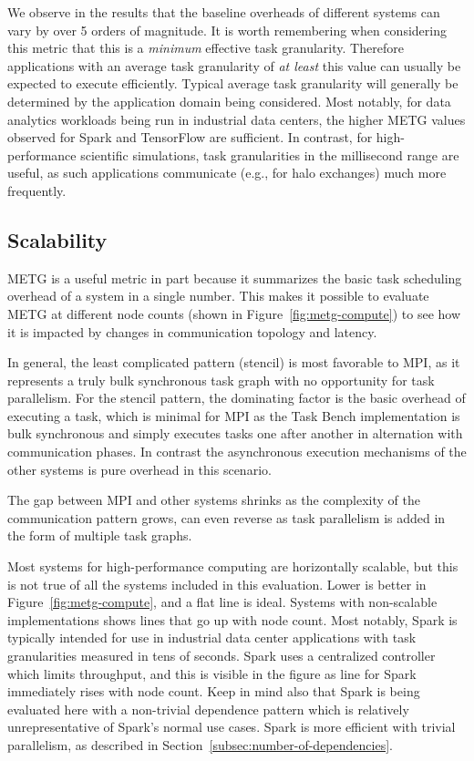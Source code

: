 We observe in the results that the baseline overheads of different
systems can vary by over 5 orders of magnitude. It is worth
remembering when considering this metric that this is a \emph{minimum}
effective task granularity. Therefore applications with an average
task granularity of \emph{at least} this value can usually be expected
to execute efficiently. Typical average task granularity will
generally be determined by the application domain being
considered. Most notably, for data analytics workloads being run in
industrial data centers, the higher METG values observed for Spark and
TensorFlow are sufficient. In contrast, for high-performance
scientific simulations, task granularities in the millisecond range
are useful, as such applications communicate (e.g., for halo
exchanges) much more frequently.

\subsection{Scalability}
\label{subsec:scalability}

METG is a useful metric in part because it summarizes the basic task
scheduling overhead of a system in a single number. This makes it
possible to evaluate METG at different node counts (shown in
Figure~\ref{fig:metg-compute}) to see how it is impacted by changes in
communication topology and latency.

In general, the least complicated pattern (stencil) is most favorable
to MPI, as it represents a truly bulk synchronous task graph with no
opportunity for task parallelism. For the stencil pattern, the
dominating factor is the basic overhead of executing a task, which is
minimal for MPI as the Task Bench implementation is bulk synchronous
and simply executes tasks one after another in alternation with
communication phases. In contrast the asynchronous execution
mechanisms of the other systems is pure overhead in this scenario.

The gap between MPI and other systems shrinks as the complexity of the
communication pattern grows, can even reverse as task parallelism is
added in the form of multiple task graphs.


Most systems for high-performance computing are horizontally scalable,
but this is not true of all the systems included in this
evaluation. Lower is better in Figure~\ref{fig:metg-compute}, and a
flat line is ideal. Systems with non-scalable implementations shows
lines that go up with node count. Most notably, Spark is typically
intended for use in industrial data center applications with task
granularities measured in tens of seconds. Spark uses a centralized
controller which limits throughput, and this is visible in the figure
as line for Spark immediately rises with node count. Keep in mind also
that Spark is being evaluated here with a non-trivial dependence
pattern which is relatively unrepresentative of Spark's normal use
cases. Spark is more efficient with trivial parallelism, as described
in Section~\ref{subsec:number-of-dependencies}.

